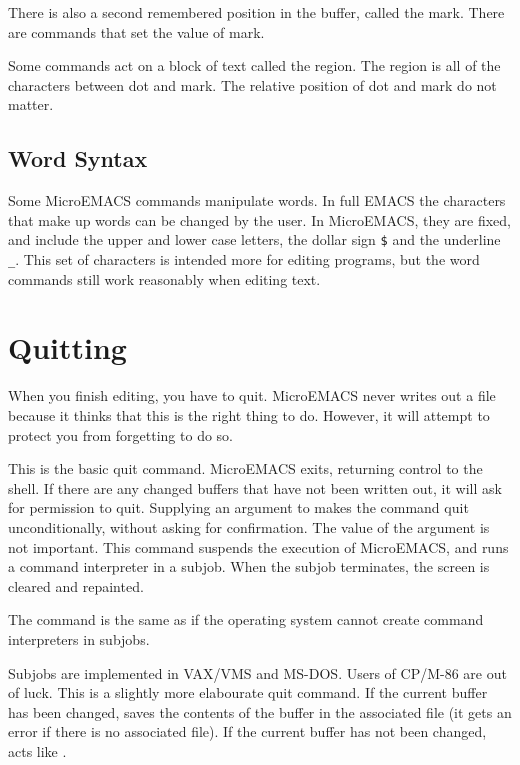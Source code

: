 There is also a second remembered position in the buffer, called the
mark. There are commands that set the value of mark.

Some commands act on a block of text called the region. The region is
all of the characters between dot and mark. The relative position of dot
and mark do not matter.
\subsection{Word Syntax}
Some MicroEMACS commands manipulate words. In full EMACS the characters
that make up words can be changed by the user. In MicroEMACS, they are
fixed, and include the upper and lower case letters, the dollar sign
\verb+$+ and the underline \verb+_+. This set of characters is intended more
for editing programs, but the word commands still work reasonably
when editing text.
\section{Quitting}
When you finish editing, you have to quit.
MicroEMACS never writes out a file because it thinks that this
is the right thing to do. However, it will attempt to protect you from
forgetting to do so.
\begin{cmdlist}
This is the basic quit command. MicroEMACS exits, returning
control to the shell. If there are any changed buffers that have not been
written out, it will ask for permission to quit. Supplying an argument to
 makes the command quit unconditionally, without asking for
confirmation. The value of the argument is not important.
This command suspends the execution of MicroEMACS, and runs
a command interpreter in a subjob. When the subjob terminates, the screen
is cleared and repainted.

The  command is the same as
 if the operating system cannot
create command interpreters in subjobs.

Subjobs are implemented in VAX/VMS and MS-DOS. Users of CP/M-86 are
out of luck.
This is a slightly more elabourate quit command.
If the current buffer has been changed,  saves the contents of
the buffer in the associated file (it gets an error if there is no
associated file). If the current buffer has not been changed, 
acts like .
\end{cmdlist}
